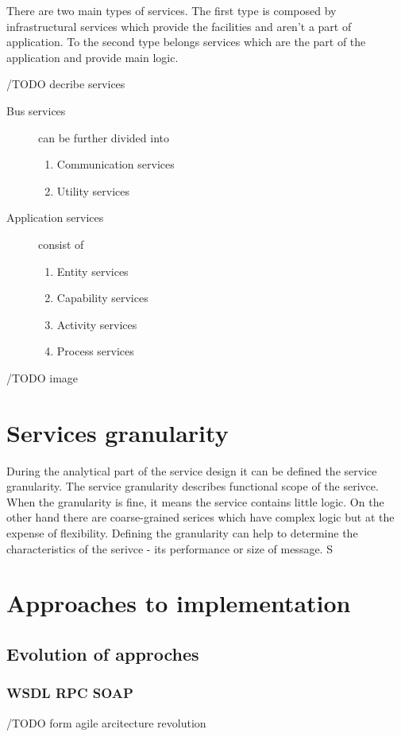 There are two main types of services. The first type is composed by infrastructural services which provide the facilities and aren't a part of application. To the second type belongs services which are the part of the application and provide main logic.

/TODO decribe services

\begin{description}
  \item[Bus services] can be further divided into 
  \begin{enumerate}
    \item Communication services 
    \item Utility services
  \end{enumerate}
  \item[Application services] consist of   
  \begin{enumerate}
    \item Entity services
    \item Capability services
    \item Activity services
    \item Process services
  \end{enumerate}
\end{description}

/TODO image

\section{Services granularity}
During the analytical part of the service design it can be defined the service granularity. The service granularity describes functional scope of the serivce. When the granularity is fine, it means the service contains little logic. On the other hand there are coarse-grained serices which have complex logic but at the expense of flexibility.
Defining the granularity can help to determine the characteristics of the serivce - its performance or size of message. \cite{soa-contract}S

\section{Approaches to implementation}

\subsection{Evolution of approches}
\subsubsection{WSDL RPC SOAP} 
/TODO form agile arcitecture revolution
 
